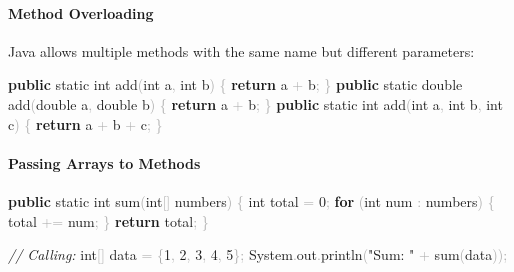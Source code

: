 \documentclass[
  justified,
  openright,
]{tufte-book}
\let\subsection\paragraph
\let\paragraph\paragraph
\newcommand{\KeywordTok}[1]{\textcolor{CodeKeyword}{\textbf{#1}}}  %
\newcommand{\StringTok}[1]{\textcolor{CodeString}{#1}}              %
\newcommand{\CommentTok}[1]{\textcolor{CodeComment}{\textit{#1}}}  %
\newcommand{\CodeNumTok}[1]{\textcolor{CodeNumber}{#1}}             %
\newcommand{\CodeFuncTok}[1]{\textcolor{CodeKeyword}{#1}}           %
\newcommand{\CodeTypeTok}[1]{\textcolor{CodeType}{#1}}              %
\newcommand{\OperatorTok}[1]{\textcolor{DarkGray}{#1}}              %
\newenvironment{Shaded}{%
  \begin{mdframed}[style=TufteCode]%
}{%
  \end{mdframed}%
}
\let\subsection\paragraph
\let\paragraph\paragraph
\begin{document}
\subsection{Method Overloading}\label{method-overloading}

Java allows multiple methods with the same name but different
parameters:

\begin{Shaded}
\begin{Highlighting}[]
\KeywordTok{public} \CodeTypeTok{static} \CodeTypeTok{int} \CodeFuncTok{add}\OperatorTok{(}\CodeTypeTok{int} a\OperatorTok{,} \CodeTypeTok{int} b\OperatorTok{)} \OperatorTok{\{} \KeywordTok{return} a \OperatorTok{+} b\OperatorTok{;} \OperatorTok{\}}
\KeywordTok{public} \CodeTypeTok{static} \CodeTypeTok{double} \CodeFuncTok{add}\OperatorTok{(}\CodeTypeTok{double} a\OperatorTok{,} \CodeTypeTok{double} b\OperatorTok{)} \OperatorTok{\{} \KeywordTok{return} a \OperatorTok{+} b\OperatorTok{;} \OperatorTok{\}}
\KeywordTok{public} \CodeTypeTok{static} \CodeTypeTok{int} \CodeFuncTok{add}\OperatorTok{(}\CodeTypeTok{int} a\OperatorTok{,} \CodeTypeTok{int} b\OperatorTok{,} \CodeTypeTok{int} c\OperatorTok{)} \OperatorTok{\{} \KeywordTok{return} a \OperatorTok{+} b \OperatorTok{+} c\OperatorTok{;} \OperatorTok{\}}
\end{Highlighting}
\end{Shaded}

\subsection{Passing Arrays to
Methods}\label{passing-arrays-to-methods}

\begin{Shaded}
\begin{Highlighting}[]
\KeywordTok{public} \CodeTypeTok{static} \CodeTypeTok{int} \CodeFuncTok{sum}\OperatorTok{(}\CodeTypeTok{int}\OperatorTok{[]} numbers\OperatorTok{)} \OperatorTok{\{}
    \CodeTypeTok{int} total \OperatorTok{=} \CodeNumTok{0}\OperatorTok{;}
    \KeywordTok{for} \OperatorTok{(}\CodeTypeTok{int} num \OperatorTok{:} numbers\OperatorTok{)} \OperatorTok{\{}
        total \OperatorTok{+=} num\OperatorTok{;}
    \OperatorTok{\}}
    \KeywordTok{return} total\OperatorTok{;}
\OperatorTok{\}}
 
\CommentTok{// Calling:}
\CodeTypeTok{int}\OperatorTok{[]} data \OperatorTok{=} \OperatorTok{\{}\CodeNumTok{1}\OperatorTok{,} \CodeNumTok{2}\OperatorTok{,} \CodeNumTok{3}\OperatorTok{,} \CodeNumTok{4}\OperatorTok{,} \CodeNumTok{5}\OperatorTok{\};}
System\OperatorTok{.}\CodeFuncTok{out}\OperatorTok{.}\CodeFuncTok{println}\OperatorTok{(}\StringTok{"Sum: "} \OperatorTok{+} \CodeFuncTok{sum}\OperatorTok{(}data\OperatorTok{));}
\end{Highlighting}
\end{Shaded}
\end{document}
